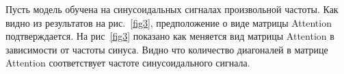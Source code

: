 \documentclass[11pt, a4paper]{article}
\begin{document}
Пусть модель обучена на синусоидальных сигналах произвольной частоты. Как видно из результатов на рис.~\ref{fig3}, предположение о виде матрицы Attention подтверждается. На рис~\ref{fig3} показано как меняется вид матрицы Attention в зависимости от частоты синуса. Видно что количество диагоналей в матрице Attention соответствует частоте синусоидального сигнала.
\end{document}
